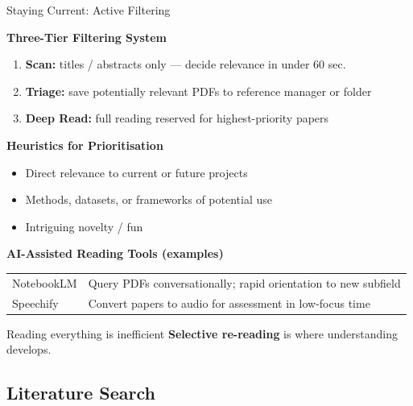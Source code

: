 \documentclass{beamer}
\begin{document}
\begin{frame}{Staying Current: Active Filtering}

  \footnotesize
  \textbf{Three-Tier Filtering System}
  \smallskip
  \begin{enumerate}
    \item \textbf{Scan:} titles / abstracts only ---
      decide relevance in under 60 sec.
    \item \textbf{Triage:} save potentially relevant PDFs
      to reference manager or folder
    \item \textbf{Deep Read:} full reading reserved for
      highest-priority papers
  \end{enumerate}

  \medskip
  \textbf{Heuristics for Prioritisation}
  \begin{itemize}
    \item Direct relevance to current or future projects
    \item Methods, datasets, or frameworks of potential use
    \item Intriguing novelty / fun
  \end{itemize}

  \medskip
  \textbf{AI-Assisted Reading Tools (examples)}

  \smallskip
  \begin{tabular}{@{}lp{7.5cm}@{}}
    \hline
    NotebookLM  & Query PDFs conversationally;
                           rapid orientation to new subfield \\
    Speechify   & Convert papers to audio for
                           assessment in low-focus time \\
    \hline
  \end{tabular}

  \vfill
  \begin{block}{Reading everything is inefficient}
    \textbf{Selective re-reading} is where understanding develops.
  \end{block}

\end{frame}


\subsection{Literature Search}
\end{document}
